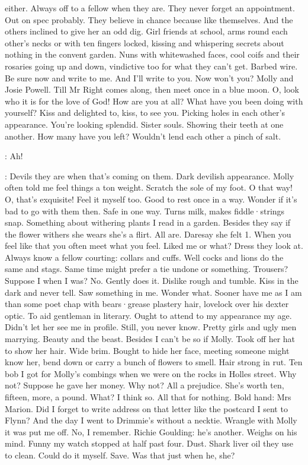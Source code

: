 either.
Always off to a fellow when they are.
They never forget an
appointment.
Out on spec probably.
They believe in chance because like
themselves.
And the others inclined to give her an odd dig.
Girl friends at school,
arms round each other's necks
or with ten fingers locked,
kissing and whispering secrets about nothing in the convent garden.
Nuns
with whitewashed faces,
cool coifs and their rosaries going up and down,
vindictive too for what they can't get.
Barbed wire.
Be sure now and write
to me.
And I'll write to you.
Now won't you?
Molly and Josie Powell.
Till
Mr Right comes along,
then meet once in a blue moon.
O,
look
who it is for the love of God!
How are you at all?
What have you been
doing with yourself?
Kiss and delighted to,
kiss,
to see you.
Picking
holes in each other's appearance.
You're looking splendid.
Sister souls.
Showing their teeth at one another.
How many have you left?
Wouldn't lend each other
a pinch of salt.

\Bloom:
Ah!

\Bloom:
Devils they are when that's coming on them.
Dark devilish appearance.
Molly often told me feel things a ton weight.
Scratch the sole of
my foot.
O that way!
O,
that's exquisite!
Feel it myself too.
Good to rest
once in a way.
Wonder if it's bad to go with them then.
Safe in one way.
Turns milk,
makes fiddle·strings snap.
Something about withering plants I
read in a garden.
Besides they say if the flower withers she wears she's a
flirt.
All are.
Daresay she felt 1.
When you feel like that you often meet
what you feel.
Liked me or what?
Dress they look at.
Always know a fellow
courting:
collars and cuffs.
Well cocks and lions do the same and stags.
Same time might prefer a tie undone or something.
Trousers?
Suppose I
when I was?
No.
Gently does it.
Dislike rough and tumble.
Kiss in the dark
and never tell.
Saw something in me.
Wonder what.
Sooner have me as I am
than some poet chap with bears·grease plastery hair,
lovelock over his
dexter optic.
To aid gentleman in literary.
Ought to attend to my
appearance my age.
Didn't let her see me in profile.
Still,
you
never know.
Pretty girls and ugly men marrying.
Beauty and the
beast.
Besides I can't be so if Molly.
Took off her hat to show
her hair.
Wide brim.
Bought to hide her face,
meeting someone might
know her,
bend down or carry a bunch of flowers to smell.
Hair strong in rut.
Ten bob I got for Molly's combings when we were on
the rocks in Holles street.
Why not?
Suppose he gave her money.
Why not?
All a prejudice.
She's worth ten,
fifteen,
more,
a pound.
What?
I
think so.
All that for nothing.
Bold hand:
Mrs Marion.
Did I forget to
write address on that letter like the postcard I sent to Flynn?
And the
day I went to Drimmie's without a necktie.
Wrangle with Molly it was put
me off.
No,
I remember.
Richie Goulding:
he's another.
Weighs on his mind.
Funny my watch stopped at half past four.
Dust.
Shark liver oil they use
to clean.
Could do it myself.
Save.
Was that just when he,
she?

